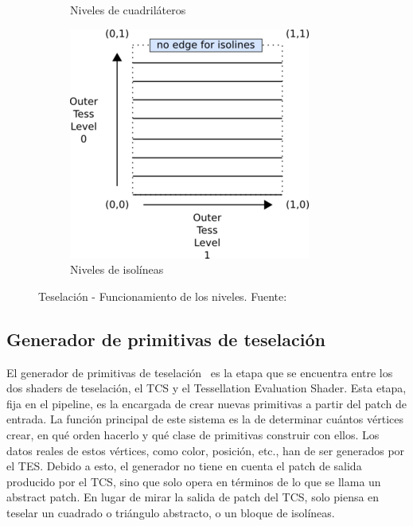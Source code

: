 \begin{figure}[t]
\begin{subfigure}{.45\textwidth}
		\caption{Niveles de cuadriláteros}
		\label{fig:quadlevels}
	\end{subfigure}
	\par\bigskip \par\bigskip \par\bigskip
	\begin{subfigure}{.45\textwidth}
		\includegraphics[width=\textwidth]{figures/300px-Tessellation_isoline.png}	
		\caption{Niveles de isolíneas}
		\label{fig:isolevels}
	\end{subfigure}
	\caption[Teselación - Funcionamiento de los niveles.]{Teselación -
	Funcionamiento de los niveles. Fuente:~\cite{TessellationImages}}
	\label{fig:tesselationlevels}	
\end{figure}

\subsection{Generador de primitivas de teselación}
\label{ref:TesPriGen}

El generador de primitivas de teselación~\cite{TesPriGen} es la etapa que se
encuentra entre los dos shaders de teselación, el TCS y el Tessellation
Evaluation Shader. Esta etapa, fija en el pipeline, es la encargada de crear
nuevas primitivas a partir del patch de entrada. La función principal de este
sistema es la de determinar cuántos vértices crear, en qué orden hacerlo y qué
clase de primitivas construir con ellos. Los datos reales de estos vértices,
como color, posición, etc., han de ser generados por el TES. Debido a esto, el
generador no tiene en cuenta el patch de salida producido por el TCS, sino que
solo opera en términos de lo que se llama un abstract patch. En lugar de mirar
la salida de patch del TCS, solo piensa en teselar un cuadrado o triángulo
abstracto, o un bloque de isolíneas.

